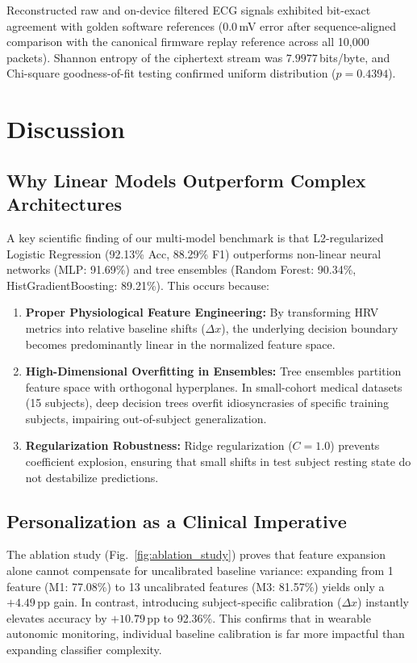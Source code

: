 \documentclass[conference]{IEEEtran}
\begin{document}
Reconstructed raw and on-device filtered ECG signals exhibited bit-exact agreement with golden software references (0.0\,mV error after sequence-aligned comparison with the canonical firmware replay reference across all 10,000 packets). Shannon entropy of the ciphertext stream was $7.9977$\,bits/byte, and Chi-square goodness-of-fit testing confirmed uniform distribution ($p = 0.4394$).

\section{Discussion}
\label{sec:discussion}

\subsection{Why Linear Models Outperform Complex Architectures}
A key scientific finding of our multi-model benchmark is that L2-regularized Logistic Regression (92.13\% Acc, 88.29\% F1) outperforms non-linear neural networks (MLP: 91.69\%) and tree ensembles (Random Forest: 90.34\%, HistGradientBoosting: 89.21\%). This occurs because:
\begin{enumerate}
    \item \textbf{Proper Physiological Feature Engineering:} By transforming HRV metrics into relative baseline shifts ($\Delta x$), the underlying decision boundary becomes predominantly linear in the normalized feature space.
    \item \textbf{High-Dimensional Overfitting in Ensembles:} Tree ensembles partition feature space with orthogonal hyperplanes. In small-cohort medical datasets (15 subjects), deep decision trees overfit idiosyncrasies of specific training subjects, impairing out-of-subject generalization.
    \item \textbf{Regularization Robustness:} Ridge regularization ($C=1.0$) prevents coefficient explosion, ensuring that small shifts in test subject resting state do not destabilize predictions.
\end{enumerate}

\subsection{Personalization as a Clinical Imperative}
The ablation study (Fig.~\ref{fig:ablation_study}) proves that feature expansion alone cannot compensate for uncalibrated baseline variance: expanding from 1 feature (M1: 77.08\%) to 13 uncalibrated features (M3: 81.57\%) yields only a $+4.49$\,pp gain. In contrast, introducing subject-specific calibration ($\Delta x$) instantly elevates accuracy by $+10.79$\,pp to 92.36\%. This confirms that in wearable autonomic monitoring, individual baseline calibration is far more impactful than expanding classifier complexity.
\end{document}
